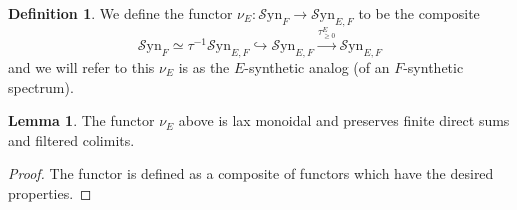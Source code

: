 \documentclass[10pt]{amsart}
\theoremstyle{definition}
\numberwithin{figure}{section}
\numberwithin{equation}{section}
\newtheorem{lemma}[figure]{Lemma}
\newtheorem{definition}[figure]{Definition}
\theoremstyle{cited}
\newcommand{\Syn}{\mathcal{S}\mathrm{yn}}
\begin{document}
\begin{definition}
  We define the functor $\nu_E:\Syn_{F}\to \Syn_{E,F}$ to be the composite
  \[
  \Syn_{F}\simeq \tau^{-1}\Syn_{E,F} \hookrightarrow \Syn_{E,F}\xrightarrow{\tau^E_{\geq 0}}\Syn_{E,F}
  \]
  and we will refer to this $\nu_E$ is as the $E$-synthetic analog (of an $F$-synthetic spectrum).
\end{definition}

\begin{lemma}
  The functor $\nu_E$ above is lax monoidal and preserves finite direct sums and filtered colimits.
\end{lemma}

\begin{proof}
    The functor is defined as a composite of functors which have the desired properties.
\end{proof}
\end{document}
